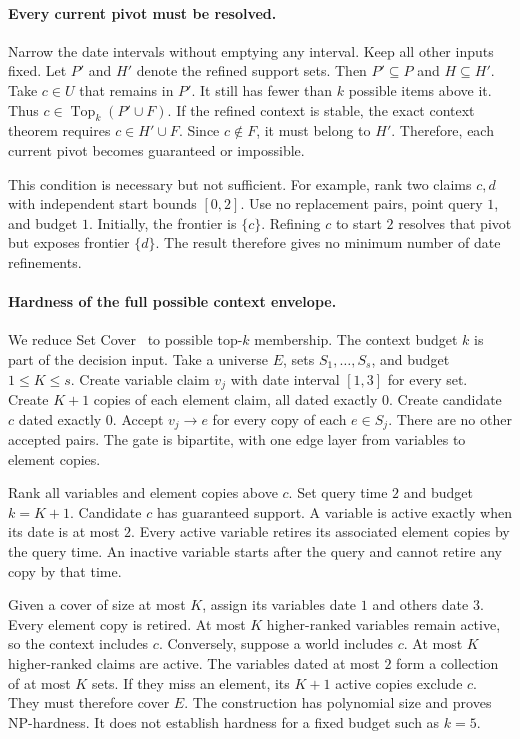 \paragraph{Every current pivot must be resolved.}
Narrow the date intervals without emptying any interval.
Keep all other inputs fixed.
Let $P'$ and $H'$ denote the refined support sets.
Then $P'\subseteq P$ and $H\subseteq H'$.
Take $c\in U$ that remains in $P'$.
It still has fewer than $k$ possible items above it.
Thus $c\in\operatorname{Top}_k(P'\cup F)$.
If the refined context is stable, the exact context theorem requires $c\in H'\cup F$.
Since $c\notin F$, it must belong to $H'$.
Therefore, each current pivot becomes guaranteed or impossible.

This condition is necessary but not sufficient.
For example, rank two claims $c,d$ with independent start bounds $[0,2]$.
Use no replacement pairs, point query $1$, and budget $1$.
Initially, the frontier is $\{c\}$.
Refining $c$ to start $2$ resolves that pivot but exposes frontier $\{d\}$.
The result therefore gives no minimum number of date refinements.

\paragraph{Hardness of the full possible context envelope.}
We reduce Set Cover~\citep{karp1972reducibility} to possible top-$k$ membership.
The context budget $k$ is part of the decision input.
Take a universe $E$, sets $S_1,\ldots,S_s$, and budget $1\le K\le s$.
Create variable claim $v_j$ with date interval $[1,3]$ for every set.
Create $K+1$ copies of each element claim, all dated exactly $0$.
Create candidate $c$ dated exactly $0$.
Accept $v_j\to e$ for every copy of each $e\in S_j$.
There are no other accepted pairs.
The gate is bipartite, with one edge layer from variables to element copies.

Rank all variables and element copies above $c$.
Set query time $2$ and budget $k=K+1$.
Candidate $c$ has guaranteed support.
A variable is active exactly when its date is at most $2$.
Every active variable retires its associated element copies by the query time.
An inactive variable starts after the query and cannot retire any copy by that time.

Given a cover of size at most $K$, assign its variables date $1$ and others date $3$.
Every element copy is retired.
At most $K$ higher-ranked variables remain active, so the context includes $c$.
Conversely, suppose a world includes $c$.
At most $K$ higher-ranked claims are active.
The variables dated at most $2$ form a collection of at most $K$ sets.
If they miss an element, its $K+1$ active copies exclude $c$.
They must therefore cover $E$.
The construction has polynomial size and proves NP-hardness.
It does not establish hardness for a fixed budget such as $k=5$.

